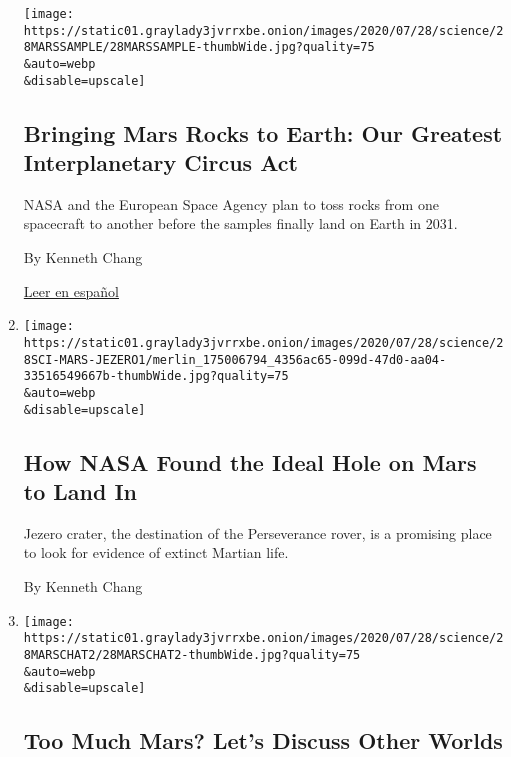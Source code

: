 \begin{enumerate}
  \texttt{[image: https://static01.graylady3jvrrxbe.onion/images/2020/07/28/science/28MARSSAMPLE/28MARSSAMPLE-thumbWide.jpg?quality=75\\\&auto=webp\\\&disable=upscale]}

  \hypertarget{bringing-mars-rocks-to-earth-our-greatest-interplanetary-circus-act}{%
  \subsection{Bringing Mars Rocks to Earth: Our Greatest Interplanetary
  Circus
  Act}\label{bringing-mars-rocks-to-earth-our-greatest-interplanetary-circus-act}}

  NASA and the European Space Agency plan to toss rocks from one
  spacecraft to another before the samples finally land on Earth in
  2031.

  By Kenneth Chang

  \href{https://www.nytimes3xbfgragh.onion/es/2020/07/29/espanol/ciencia-y-tecnologia/mision-marte-nasa.html}{Leer
  en español}
\item
  \href{/2020/07/28/science/nasa-jezero-perseverance.html}{}

  \texttt{[image: https://static01.graylady3jvrrxbe.onion/images/2020/07/28/science/28SCI-MARS-JEZERO1/merlin\_175006794\_4356ac65-099d-47d0-aa04-33516549667b-thumbWide.jpg?quality=75\\\&auto=webp\\\&disable=upscale]}

  \hypertarget{how-nasa-found-the-ideal-hole-on-mars-to-land-in}{%
  \subsection{How NASA Found the Ideal Hole on Mars to Land
  In}\label{how-nasa-found-the-ideal-hole-on-mars-to-land-in}}

  Jezero crater, the destination of the Perseverance rover, is a
  promising place to look for evidence of extinct Martian life.

  By Kenneth Chang
\item
  \href{/2020/07/28/science/mars-nasa-science.html}{}

  \texttt{[image: https://static01.graylady3jvrrxbe.onion/images/2020/07/28/science/28MARSCHAT2/28MARSCHAT2-thumbWide.jpg?quality=75\\\&auto=webp\\\&disable=upscale]}

  \hypertarget{too-much-mars-lets-discuss-other-worlds}{%
  \subsection{Too Much Mars? Let's Discuss Other
  Worlds}\label{too-much-mars-lets-discuss-other-worlds}}


\end{enumerate}
